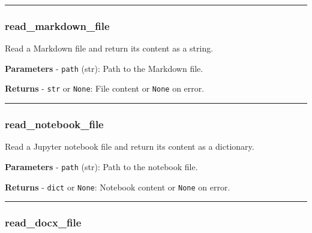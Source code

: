 \begin{center}\rule{0.5\linewidth}{0.5pt}\end{center}

\subsubsection{read\_markdown\_file}\label{read_markdown_file}

\begin{Shaded}
\begin{Highlighting}[]
\end{Highlighting}
\end{Shaded}

Read a Markdown file and return its content as a string.

\textbf{Parameters} - \texttt{path} (str): Path to the Markdown file.

\textbf{Returns} - \texttt{str} or \texttt{None}: File content or
\texttt{None} on error.

\begin{center}\rule{0.5\linewidth}{0.5pt}\end{center}

\subsubsection{read\_notebook\_file}\label{read_notebook_file}

\begin{Shaded}
\begin{Highlighting}[]
\end{Highlighting}
\end{Shaded}

Read a Jupyter notebook file and return its content as a dictionary.

\textbf{Parameters} - \texttt{path} (str): Path to the notebook file.

\textbf{Returns} - \texttt{dict} or \texttt{None}: Notebook content or
\texttt{None} on error.

\begin{center}\rule{0.5\linewidth}{0.5pt}\end{center}

\subsubsection{read\_docx\_file}\label{read_docx_file}

